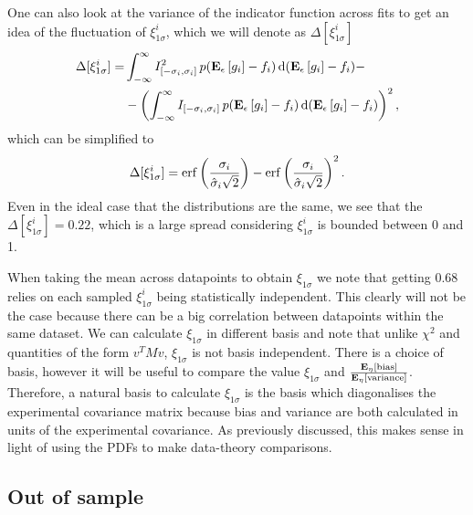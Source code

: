 One can also look at the variance of the indicator function across fits to get
an idea of the fluctuation of $\xi_{1\sigma}^{i}$, which we will denote as
$\Delta[\xi_{1\sigma}^{i}]$
\begin{equation}
    \label{eq:XiIVar}
    \begin{split}
        \Delta[\xi_{1\sigma}^{i}] 
        =& \int_{-\infty}^{\infty} I_{[-\sigma_i, \sigma_i]}^2\, 
            p(\mathbf{E}_{\epsilon}\left[ g_i \right] - f_i)\,
            {\rm d}(\mathbf{E}_{\epsilon}\left[ g_i \right] - f_i) - \\
        &- \left( \int_{-\infty}^{\infty} I_{[-\sigma_i, \sigma_i]}\,
            p(\mathbf{E}_{\epsilon}\left[ g_i \right] - f_i)\,
            {\rm d}(\mathbf{E}_{\epsilon}\left[ g_i \right] - f_i) \right)^2,
    \end{split}
\end{equation}
which can be simplified to
\begin{equation}
    \label{eq:XiIVarSimplified}
    \Delta[\xi_{1\sigma}^{i}] =
    {\rm erf} \left( \frac{\sigma_i}{\hat{\sigma}_i \sqrt{2}}\right) -
    {\rm erf} \left( \frac{\sigma_i}{\hat{\sigma}_i \sqrt{2}}\right)^2.
\end{equation}
Even in the ideal case that the distributions are the same, we see that the
$\Delta[\xi_{1\sigma}^{i}] = 0.22$, which is a large spread considering
$\xi_{1\sigma}^{i}$ is bounded between 0 and 1.

When taking the mean across datapoints to obtain $\xi_{1\sigma}$ we note that
getting 0.68 relies on each sampled $\xi_{1\sigma}^{i}$ being statistically
independent. This clearly will not be the case because there can be a big
correlation between datapoints within the same dataset. We can calculate
$\xi_{1\sigma}$ in different basis and note that unlike $\chi^2$ and quantities
of the form $v^T M v$, $\xi_{1\sigma}$ is not basis independent. There is a
choice of basis, however it will be useful to compare the value $\xi_{1\sigma}$
and $\frac{\mathbf{E}_{\eta}\left[ {\rm bias} \right]}{\mathbf{E}_{\eta}\left[ {\rm variance} \right]}$. Therefore, a natural basis to
calculate $\xi_{1\sigma}$ is the basis which diagonalises the experimental
covariance matrix because bias and variance are both calculated in units of the
experimental
covariance. As previously discussed, this makes sense in light of using the PDFs
to make data-theory comparisons.
\subsection{Out of sample}

